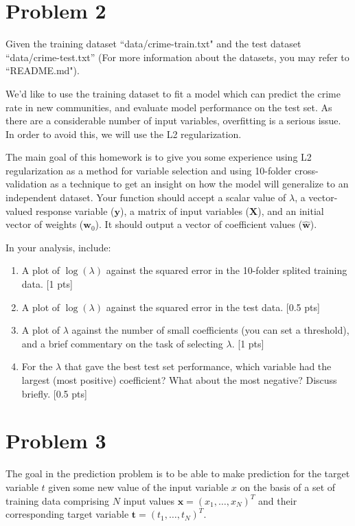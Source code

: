 \documentclass[10pt]{article}
\renewcommand{\mathbf}{\boldsymbol}
\begin{document}
\section*{Problem 2}
Given the training dataset ``data/crime-train.txt"  and the test dataset ``data/crime-test.txt'' (For more information about the datasets, you may refer to ``README.md").

We'd like to use the training dataset to fit a model which can predict the crime rate in new communities, and evaluate model performance on the test set. As there are a considerable number of input variables, overfitting is a serious issue. In order to avoid this, we will use the L2 regularization. 

The main goal of this homework is to give you some experience using L2 regularization as a method for variable selection and using 10-folder cross-validation as a technique to get an insight on how the model will generalize to an independent dataset.
Your function should accept a scalar value of $\lambda$, a vector-valued response variable ($\mathbf{y}$), a matrix of input variables ($\mathbf{X}$), and an initial vector of weights ($\mathbf{w}_0$). It should output a vector of coefficient values ($\hat{\mathbf{w}}$).

In your analysis, include:
\begin{enumerate}


\item  A plot of $\log(\lambda)$ against the squared error in the 10-folder splited training data. {\color{red} [1 pts]}
\item  A plot of $\log(\lambda)$ against the squared error in the test data. {\color{red} [0.5 pts]}
\item  A plot of $\lambda$ against the number of small coefficients (you can set a threshold), and a brief commentary on the task of selecting $\lambda$. {\color{red} [1 pts]}
\item  For the $\lambda$ that gave the best test set performance, which variable had the largest (most positive) coefficient? What about the most negative? Discuss briefly.  {\color{red} [0.5 pts]}
\end{enumerate}



\section*{Problem 3}
The goal in the prediction problem is to be able to make prediction for the target variable $t$ given some new value of the input variable $x$ on the basis of a set of training data comprising $N$ input values $\mathbf{x} = (x_1,\dots,x_N)^T$ and their corresponding target variable $\mathbf{t}= (t_1,\dots,t_N)^T$. 
\end{document}

